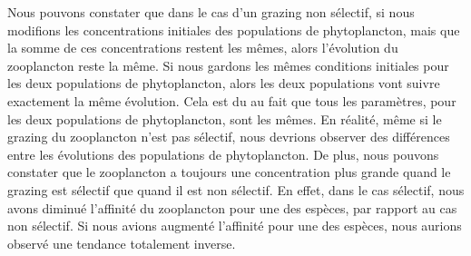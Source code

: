 Nous pouvons constater que dans le cas d'un grazing non sélectif, si nous modifions les concentrations initiales des populations de phytoplancton, mais que la somme de ces concentrations restent les mêmes, alors l'évolution du zooplancton reste la même. Si nous gardons les mêmes conditions initiales pour les deux populations de phytoplancton, alors les deux populations vont suivre exactement la même évolution. Cela est du au fait que tous les paramètres, pour les deux populations de phytoplancton, sont les mêmes. En réalité, même si le grazing du zooplancton n'est pas sélectif, nous devrions observer des différences entre les évolutions des populations de phytoplancton.
De plus, nous pouvons constater que le zooplancton a toujours une concentration plus grande quand le grazing est sélectif que quand il est non sélectif. En effet, dans le cas sélectif, nous avons diminué l'affinité du zooplancton pour une des espèces, par rapport au cas non sélectif. Si nous avions augmenté l'affinité pour une des espèces, nous aurions observé une tendance totalement inverse.
